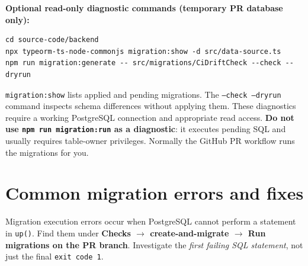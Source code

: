 \documentclass[10pt,a4paper]{article}
\begin{document}
\begin{tcolorbox}[colback=white,colframe=lightborder,boxrule=.7pt,arc=2mm]
\textbf{Optional read-only diagnostic commands (temporary PR database only):}
\begin{lstlisting}[style=command]
cd source-code/backend
npx typeorm-ts-node-commonjs migration:show -d src/data-source.ts
npm run migration:generate -- src/migrations/CiDriftCheck --check --dryrun
\end{lstlisting}
\texttt{migration:show} lists applied and pending migrations. The \texttt{--check --dryrun} command inspects schema differences without applying them. These diagnostics require a working PostgreSQL connection and appropriate read access. \textbf{Do not use \texttt{npm run migration:run} as a diagnostic}: it executes pending SQL and usually requires table-owner privileges. Normally the GitHub PR workflow runs the migrations for you.
\end{tcolorbox}

\section*{Common migration errors and fixes}
Migration execution errors occur when PostgreSQL cannot perform a statement in \texttt{up()}. Find them under \textbf{Checks $\rightarrow$ create-and-migrate $\rightarrow$ Run migrations on the PR branch}. Investigate the \emph{first failing SQL statement}, not just the final \texttt{exit code 1}.
\end{document}
